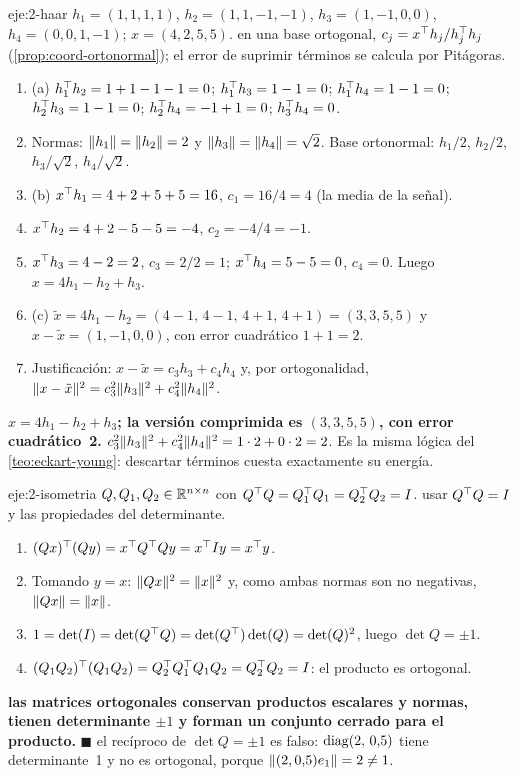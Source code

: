 \begin{solucion}{eje:2-haar}
\datos $h_1=(1,1,1,1)$, $h_2=(1,1,-1,-1)$, $h_3=(1,-1,0,0)$, $h_4=(0,0,1,-1)$; $x=(4,2,5,5)$.
\planteamiento en una base ortogonal, $c_j=x^{\top} h_j/h_j^{\top} h_j$ (\cref{prop:coord-ortonormal}); el error de suprimir términos se calcula por Pitágoras.
\pasos
\begin{enumerate}[label=\arabic*.]
  \item (a) $h_1^{\top} h_2=1+1-1-1=0$; $h_1^{\top} h_3=1-1=0$; $h_1^{\top} h_4=1-1=0$; $h_2^{\top} h_3=1-1=0$; $h_2^{\top} h_4=-1+1=0$; $h_3^{\top} h_4=0$.
  \item Normas: $\lVert h_1\rVert=\lVert h_2\rVert=2$ y $\lVert h_3\rVert=\lVert h_4\rVert=\sqrt{2}$. Base ortonormal: $h_1/2$, $h_2/2$, $h_3/\sqrt{2}$, $h_4/\sqrt{2}$.
  \item (b) $x^{\top} h_1=4+2+5+5=16$, $c_1=16/4=4$ (la media de la señal).
  \item $x^{\top} h_2=4+2-5-5=-4$, $c_2=-4/4=-1$.
  \item $x^{\top} h_3=4-2=2$, $c_3=2/2=1$; $x^{\top} h_4=5-5=0$, $c_4=0$. Luego $x=4h_1-h_2+h_3$.
  \item (c) $\tilde x=4h_1-h_2=(4-1,\,4-1,\,4+1,\,4+1)=(3,3,5,5)$ y $x-\tilde x=(1,-1,0,0)$, con error cuadrático $1+1=2$.
  \item Justificación: $x-\tilde x=c_3h_3+c_4h_4$ y, por ortogonalidad, $\lVert x-\tilde x\rVert^{2}=c_3^{2}\lVert h_3\rVert^{2}+c_4^{2}\lVert h_4\rVert^{2}$.
\end{enumerate}
\resultado \textbf{$x=4h_1-h_2+h_3$; la versión comprimida es $(3,3,5,5)$, con error cuadrático~2.}
\comprobacion $c_3^{2}\lVert h_3\rVert^{2}+c_4^{2}\lVert h_4\rVert^{2}=1\cdot 2+0\cdot 2=2$. Es la misma lógica del \cref{teo:eckart-young}: descartar términos cuesta exactamente su energía.
\end{solucion}

\begin{solucion}{eje:2-isometria}
\datos $Q,Q_1,Q_2\in\mathbb{R}^{n\times n}$ con $Q^{\top} Q=Q_1^{\top} Q_1=Q_2^{\top} Q_2=I$.
\planteamiento usar $Q^{\top} Q=I$ y las propiedades del determinante.
\pasos
\begin{enumerate}[label=\arabic*.]
  \item $(Qx)^{\top}(Qy)=x^{\top} Q^{\top} Qy=x^{\top} Iy=x^{\top} y$.
  \item Tomando $y=x$: $\lVert Qx\rVert^{2}=\lVert x\rVert^{2}$ y, como ambas normas son no negativas, $\lVert Qx\rVert=\lVert x\rVert$.
  \item $1=\det(I)=\det(Q^{\top} Q)=\det(Q^{\top})\det(Q)=\det(Q)^{2}$, luego $\det Q=\pm 1$.
  \item $(Q_1Q_2)^{\top}(Q_1Q_2)=Q_2^{\top} Q_1^{\top} Q_1Q_2=Q_2^{\top} Q_2=I$: el producto es ortogonal.
\end{enumerate}
\resultado \textbf{las matrices ortogonales conservan productos escalares y normas, tienen determinante $\pm 1$ y forman un conjunto cerrado para el producto.} \hfill$\blacksquare$
\comprobacion el recíproco de $\det Q=\pm1$ es falso: $\operatorname{diag}(2,\,0{,}5)$ tiene determinante~1 y no es ortogonal, porque $\lVert(2,0{,}5)e_1\rVert=2\ne 1$.
\end{solucion}

